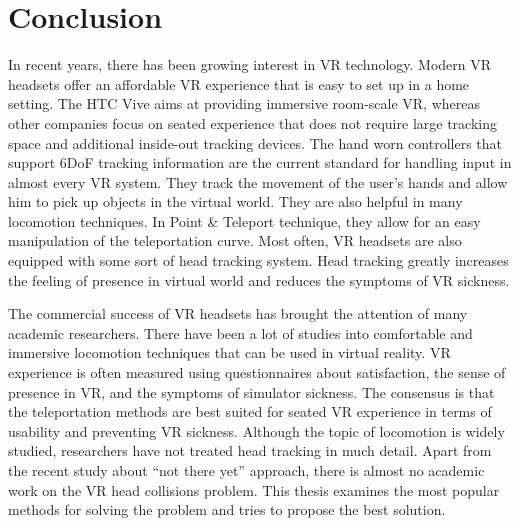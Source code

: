 \section{Conclusion}

In recent years, there has been growing interest in VR technology. Modern VR headsets offer an affordable VR experience that is easy to set up in a home setting. The HTC Vive aims at providing immersive room-scale VR, whereas other companies focus on seated experience that does not require large tracking space and additional inside-out tracking devices. The hand worn controllers that support 6DoF tracking information are the current standard for handling input in almost every VR system. They track the movement of the user's hands and allow him to pick up objects in the virtual world. They are also helpful in many locomotion techniques. In Point \& Teleport technique, they allow for an easy manipulation of the teleportation curve. Most often, VR headsets are also equipped with some sort of head tracking system. Head tracking greatly increases the feeling of presence in virtual world and reduces the symptoms of VR sickness.

The commercial success of VR headsets has brought the attention of many academic researchers. There have been a lot of studies into comfortable and immersive locomotion techniques that can be used in virtual reality. VR experience is often measured using questionnaires about satisfaction, the sense of presence in VR, and the symptoms of simulator sickness. The consensus is that the teleportation methods are best suited for seated VR experience in terms of usability and preventing VR sickness. Although the topic of locomotion is widely studied, researchers have not treated head tracking in much detail. Apart from the recent study about ``not there yet'' approach, there is almost no academic work on the VR head collisions problem. This thesis examines the most popular methods for solving the problem and tries to propose the best solution.